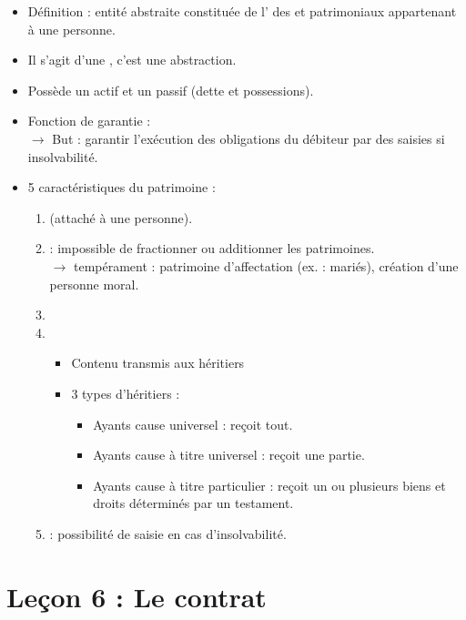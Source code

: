 \begin{itemize}
	\item Définition : entité abstraite constituée de l' des  et  patrimoniaux appartenant à une personne.
	\item Il s'agit d'une , c'est une abstraction.
	\item Possède un actif et un passif (dette et possessions).
	\item Fonction de garantie :\\
	$\rightarrow$ But : garantir l'exécution des obligations du débiteur par des saisies si insolvabilité.
	\item 5 caractéristiques du patrimoine :
	\begin{enumerate}
		\item {} (attaché à une personne).
		\item {} : impossible de fractionner ou additionner les patrimoines.\\
		$\rightarrow$ tempérament : patrimoine d'affectation (ex. : mariés), création d'une personne moral.
		\item {}
		\item {}
		\begin{itemize}
			\item Contenu transmis aux héritiers
			\item 3 types d'héritiers :
			\begin{itemize}
				\item Ayants cause universel : reçoit tout.
				\item Ayants cause à titre universel : reçoit une partie.
				\item Ayants cause à titre particulier : reçoit un ou plusieurs biens et droits déterminés par un testament.
			\end{itemize}
		\end{itemize}
		\item {} : possibilité de saisie en cas d'insolvabilité.
	\end{enumerate}
\end{itemize}

\newpage
\chapter{Leçon 6 : Le contrat}

